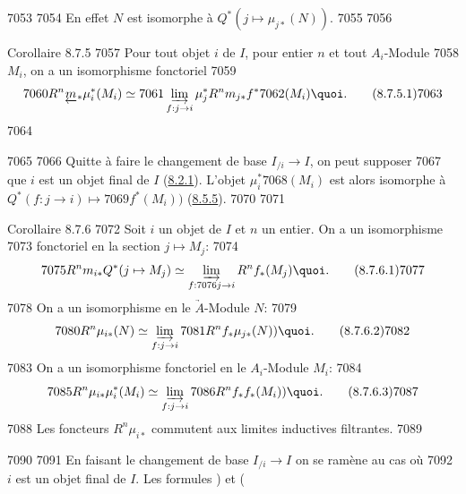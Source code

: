   7053	
  7054	En effet $N$ est isomorphe à $Q^{\ast}(j \mapsto \mu_{j \ast}(N))$.
  7055	
  7056	\begin{enonce*}{Corollaire 8.7.5}
  7057	Pour tout objet $i$ de $I$, pour entier $n$ et tout $A_i$-Module
  7058	$M_i$, on a un isomorphisme fonctoriel
  7059	\begin{equation*}
  7060	R^n \underleftarrow{m}_{\ast} \mu^{\ast}_i (M_i) \simeq
  7061	\varinjlim_{f : j \to i} \mu^{\ast}_j R^n m_{j\ast} f^{\ast}
  7062	(M_i){\quoi}.\tag{8.7.5.1}
  7063	\end{equation*}
  7064	\end{enonce*}
  7065	
  7066	Quitte à faire le changement de base $I_{/i} \to I$, on peut supposer
  7067	que $i$ est un objet final de $I$ (\hyperref[VI.lem8.2.1]{8.2.1}). L'objet $\mu_{i}^{\ast}
  7068	(M_i)$ est alors isomorphe à $Q^{\ast} (f : j \to i) \mapsto
  7069	f^{\ast}(M_i))$ (\cf \hyperref[VI.cor8.5.5]{8.5.5}).
  7070	
  7071	\begin{enonce*}{Corollaire 8.7.6}
  7072	Soit $i$ un objet de $I$ et $n$ un entier. On a un isomorphisme
  7073	fonctoriel en la section $j \mapsto M_j$:
  7074	\begin{equation*}
  7075	R^n m_{i\ast} Q^{\ast} (j \mapsto M_j) \simeq \varinjlim_{f :
  7076	  j \to i} R^n f_{\ast} (M_j){\quoi}.\tag{8.7.6.1}
  7077	\end{equation*}
  7078	On a un isomorphisme en le $\underrightarrow{A}$-Module $N$:
  7079	\begin{equation*}
  7080	R^n \mu_{i\ast} (N) \simeq \varinjlim_{f:j\to i}
  7081	R^n f_{\ast} \mu_{j\ast} (N)){\quoi}.\tag{8.7.6.2}
  7082	\end{equation*}
  7083	On a un isomorphisme fonctoriel en le $A_i$-Module $M_i$:
  7084	\begin{equation*}
  7085	R^n \mu_{i\ast} \mu^{\ast}_i (M_i) \simeq \varinjlim_{f:j\to i}
  7086	R^n f_{\ast} f_{\ast} (M_i)){\quoi}.\tag{8.7.6.3}
  7087	\end{equation*}
  7088	Les foncteurs $R^n \mu_{i \ast}$ commutent aux limites inductives filtrantes.
  7089	\end{enonce*}
  7090	
  7091	En faisant le changement de base $I_{/i} \to I$ on se ramène au cas où
  7092	$i$ est un objet final de $I$. Les formules ) et (
